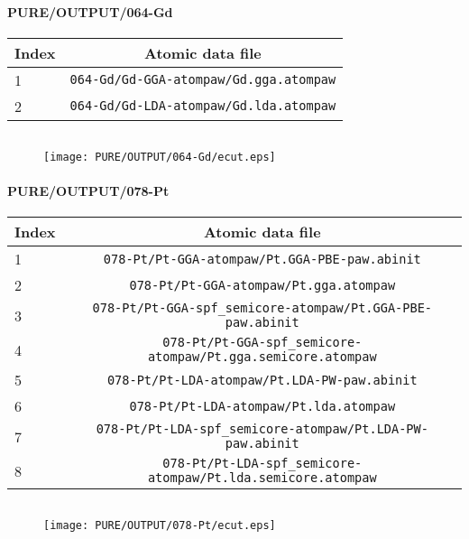 \documentclass[onecolumn]{revtex4}
\begin{document}
\paragraph*{\bf{PURE/OUTPUT/064-Gd}}
\begin{center}
\begin{tabular}{lc}
\hline
Index & Atomic data file \\
\hline
1 & \verb?064-Gd/Gd-GGA-atompaw/Gd.gga.atompaw?\\
2 & \verb?064-Gd/Gd-LDA-atompaw/Gd.lda.atompaw?\\
\hline
\end{tabular}
\end{center}
\begin{center}
\begin{tabular}{lccccc}
\hline
\hline
\end{tabular}
\end{center}
\begin{figure}[h] 
\centering 
\texttt{[image: PURE/OUTPUT/064-Gd/ecut.eps]}
\end{figure}
\newpage
\paragraph*{\bf{PURE/OUTPUT/078-Pt}}
\begin{center}
\begin{tabular}{lc}
\hline
Index & Atomic data file \\
\hline
1 & \verb?078-Pt/Pt-GGA-atompaw/Pt.GGA-PBE-paw.abinit?\\
2 & \verb?078-Pt/Pt-GGA-atompaw/Pt.gga.atompaw?\\
3 & \verb?078-Pt/Pt-GGA-spf_semicore-atompaw/Pt.GGA-PBE-paw.abinit?\\
4 & \verb?078-Pt/Pt-GGA-spf_semicore-atompaw/Pt.gga.semicore.atompaw?\\
5 & \verb?078-Pt/Pt-LDA-atompaw/Pt.LDA-PW-paw.abinit?\\
6 & \verb?078-Pt/Pt-LDA-atompaw/Pt.lda.atompaw?\\
7 & \verb?078-Pt/Pt-LDA-spf_semicore-atompaw/Pt.LDA-PW-paw.abinit?\\
8 & \verb?078-Pt/Pt-LDA-spf_semicore-atompaw/Pt.lda.semicore.atompaw?\\
\hline
\end{tabular}
\end{center}
\begin{center}
\begin{tabular}{lccccc}
\hline
\hline
\end{tabular}
\end{center}
\begin{figure}[h] 
\centering 
\texttt{[image: PURE/OUTPUT/078-Pt/ecut.eps]}
\end{figure}
\newpage
\end{document}
